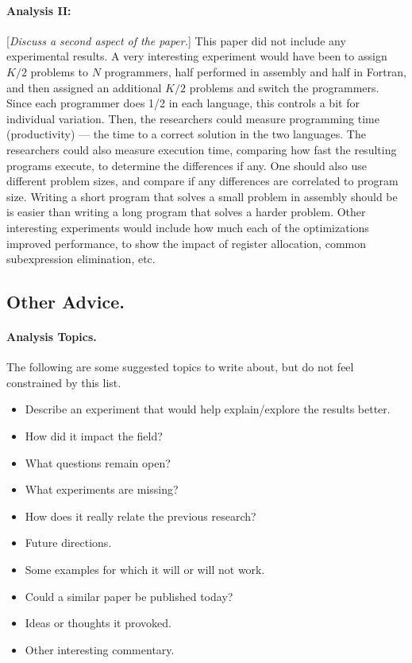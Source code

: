 \documentclass[12pt]{article}
\begin{document}
\paragraph{Analysis II:} [\emph{Discuss a second aspect of the paper.}]
This paper did not include any experimental results.  A very interesting
experiment would have been to assign $K/2$ problems to $N$ programmers, half
performed in assembly and half in Fortran, and then assigned an additional
$K/2$ problems and switch the programmers. Since each programmer does 1/2 in
each language, this controls a bit for individual variation.  Then, the
researchers could measure programming time (productivity) --- the time
to a correct solution in the two languages. The researchers could also measure
execution time, comparing how fast the resulting programs execute, to
determine the differences if any.  One should also use different problem
sizes, and compare if any differences are correlated to program size.  Writing
a short program that solves a small problem in assembly should be is easier
than writing a long program that solves a harder problem.  Other interesting
experiments would include how much each of the optimizations improved
performance, to show the impact of register allocation, common subexpression
elimination, etc.

\subsection*{Other Advice.}

\paragraph{Analysis Topics.}
The following are some suggested topics to write about, but do not feel
constrained by this list.
\begin{itemize}
\item Describe an experiment that would help explain/explore the
  results better.
\item How did it impact the field?
\item What questions remain open?
\item What experiments are missing?
\item How does it really relate the previous research?
\item Future directions.
\item Some examples for which it will or will not work.
\item Could a similar paper be published today?
\item Ideas or thoughts it provoked.
\item Other interesting commentary.
\end{itemize}
\end{document}
